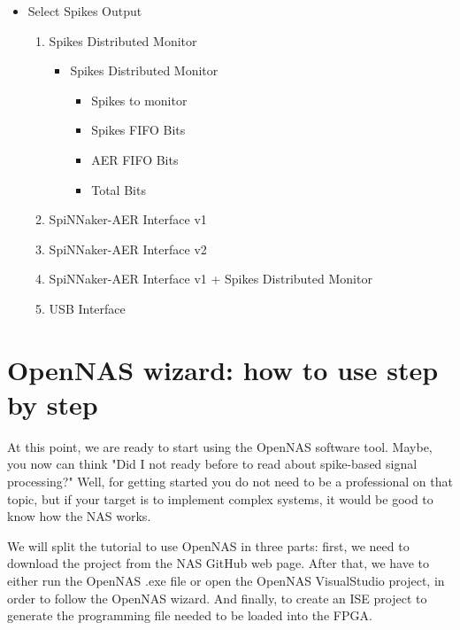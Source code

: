 \begin{itemize}
    \item Select Spikes Output
        \begin{enumerate}
            \item Spikes Distributed Monitor
                \begin{itemize}
                    \item Spikes Distributed Monitor
                        \begin{itemize}
                            \item Spikes to monitor
                            \item Spikes FIFO Bits
                            \item AER FIFO Bits
                            \item Total Bits
                        \end{itemize}
                \end{itemize}
            \item SpiNNaker-AER Interface v1
            
            \item SpiNNaker-AER Interface v2
            
            \item SpiNNaker-AER Interface v1 + Spikes Distributed Monitor
            
            \item USB Interface
            
        \end{enumerate}
\end{itemize}

\section{OpenNAS wizard: how to use step by step}
\label{sec:Steps}

At this point, we are ready to start using the OpenNAS software tool. Maybe, you now can think "Did I not ready before to read about spike-based signal processing?" Well, for getting started you do not need to be a professional on that topic, but if your target is to implement complex systems, it would be good to know how the NAS works.

We will split the tutorial to use OpenNAS in three parts: first, we need to download the project from the NAS GitHub web page. After that, we have to either run the OpenNAS .exe file or open the OpenNAS VisualStudio project, in order to follow the OpenNAS wizard. And finally, to create an ISE project to generate the programming file needed to be loaded into the FPGA. 

